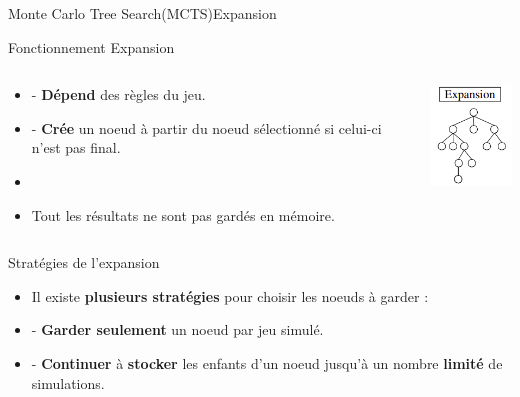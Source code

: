 \begin{frame}{Monte Carlo Tree Search(MCTS)}{Expansion}
	\begin{block}{Fonctionnement Expansion}
		\begin{columns}
			\begin{column}{8cm}
				\begin{itemize}
					\item - \textbf{Dépend} des règles du jeu.
					\item - \textbf{Crée} un noeud à partir du noeud sélectionné si celui-ci n'est pas final.
					\item \
					\item Tout les résultats ne sont pas gardés en mémoire.
				\end{itemize}
			\end{column}
			\begin{column}{4cm}
				\includegraphics[width=2.5cm]{ressources/MCTS/Expansion.png}
			\end{column}
		\end{columns}
	\end{block}
	\begin{block}{Stratégies de l'expansion}
		\begin{itemize}
			\item Il existe \textbf{plusieurs stratégies} pour choisir les noeuds à garder :
			\item - \textbf{Garder seulement} un noeud par jeu simulé.
			\item - \textbf{Continuer} à \textbf{stocker} les enfants d'un noeud jusqu'à un nombre \textbf{limité} de simulations.
		\end{itemize}
	\end{block}
\end{frame}

